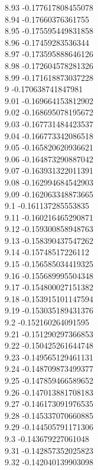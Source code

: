 {8.93	-0.177617808455078\\
8.94	-0.17660376361755\\
8.95	-0.175595449831858\\
8.96	-0.17459283536344\\
8.97	-0.173595888646126\\
8.98	-0.172604578281326\\
8.99	-0.171618873037228\\
9	-0.170638741847981\\
9.01	-0.169664153812902\\
9.02	-0.168695078195672\\
9.03	-0.167731484423537\\
9.04	-0.166773342086518\\
9.05	-0.165820620936621\\
9.06	-0.164873290887042\\
9.07	-0.163931322011391\\
9.08	-0.162994684542903\\
9.09	-0.162063348873665\\
9.1	-0.161137285553835\\
9.11	-0.160216465290871\\
9.12	-0.159300858948763\\
9.13	-0.158390437547262\\
9.14	-0.15748517226112\\
9.15	-0.156585034419325\\
9.16	-0.155689995504348\\
9.17	-0.154800027151382\\
9.18	-0.153915101147594\\
9.19	-0.153035189431376\\
9.2	-0.152160264091595\\
9.21	-0.151290297366853\\
9.22	-0.150425261644748\\
9.23	-0.149565129461131\\
9.24	-0.148709873499377\\
9.25	-0.147859466589652\\
9.26	-0.147013881708183\\
9.27	-0.146173091976535\\
9.28	-0.145337070660885\\
9.29	-0.144505791171306\\
9.3	-0.143679227061048\\
9.31	-0.142857352025823\\
9.32	-0.142040139903098\\
}
